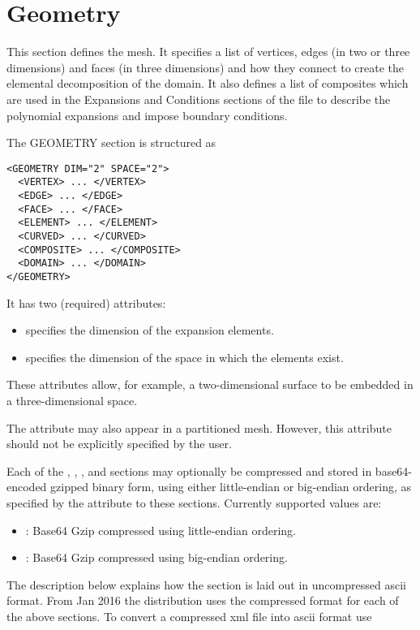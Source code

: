 \section{Geometry}
This section defines the mesh. It specifies a list of vertices, edges (in two or
three dimensions) and faces (in three dimensions) and how they connect to create
the elemental decomposition of the domain. It also defines a list of composites
which are used in the Expansions and Conditions sections of the file to describe
the polynomial expansions and impose boundary conditions.

The GEOMETRY section is structured as
\begin{lstlisting}[style=XMLStyle]
<GEOMETRY DIM="2" SPACE="2">
  <VERTEX> ... </VERTEX>
  <EDGE> ... </EDGE>
  <FACE> ... </FACE>
  <ELEMENT> ... </ELEMENT>
  <CURVED> ... </CURVED>
  <COMPOSITE> ... </COMPOSITE>
  <DOMAIN> ... </DOMAIN>
</GEOMETRY>
\end{lstlisting}
It has two (required) attributes:
\begin{itemize}
    \item {} specifies the dimension of the expansion elements.
    \item {} specifies the dimension of the space in which the
    elements exist.
\end{itemize}
These attributes allow, for example, a two-dimensional surface to be embedded in
a three-dimensional space.

\begin{notebox}
The attribute  may also appear in a partitioned mesh.
However, this attribute should not be explicitly specified by the user.
\end{notebox}

Each of the , , , 
and  sections may optionally be compressed and stored in
base64-encoded gzipped binary form, using either little-endian or big-endian
ordering, as specified by the  attribute to these sections.
Currently supported values are:
\begin{itemize}
    \item {}: Base64 Gzip compressed using little-endian
        ordering.
    \item {}: Base64 Gzip compressed using big-endian
        ordering.
\end{itemize}

\begin{notebox}
The description below explains how the  section is laid out in
uncompressed ascii format. From Jan 2016 the distribution uses the compressed
format for each of the above sections. To convert a compressed xml file into
ascii format use \\
\end{notebox}


